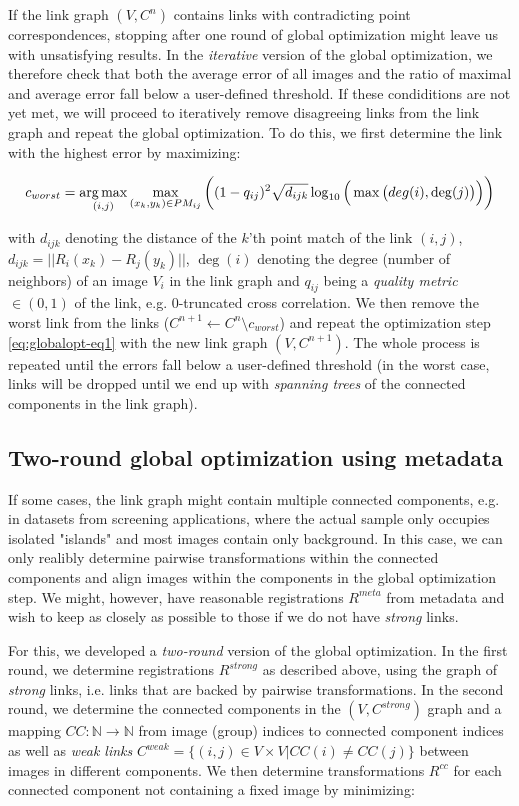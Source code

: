 If the link graph $(V,C^n)$ contains links with contradicting point correspondences, stopping after one round of global optimization might leave us with unsatisfying results. In the \emph{iterative} version of the global optimization, we therefore check that both the average error of all images and the ratio of maximal and average error fall below a user-defined threshold. If these condiditions are not yet met, we will proceed to iteratively remove disagreeing links from the link graph and repeat the global optimization. To do this, we first determine the link with the highest error by maximizing:

\begin{equation}
\label{eq:globalopt-eq3}
c_{worst} = \operatorname*{arg\,max}_{(i,j)} \max_{(x_k, y_k) \in PM_{ij}}\bigg( (1-q_{ij})^2 \sqrt{d_{ijk}} \log_{10}\Big(\max\big(deg(i), \deg(j)\big)\Big)\bigg) 
\end{equation}

with $d_{ijk}$ denoting the distance of the $k$'th point match of the link $(i,j)$, $d_{ijk} = || R_{i}(x_k) - R_{j}(y_k) ||$, $\deg(i)$ denoting the degree (number of neighbors) of an image $V_i$ in the link graph and $q_{ij}$ being a \emph{quality metric} $\in (0,1)$ of the link, e.g. 0-truncated cross correlation. We then remove the worst link from the links ($C^{n+1} \leftarrow C^{n} \setminus c_{worst}$) and repeat the optimization step \ref{eq:globalopt-eq1} with the new link graph $(V, C^{n+1})$. The whole process is repeated until the errors fall below a user-defined threshold (in the worst case, links will be dropped until we end up with \emph{spanning trees} of the connected components in the link graph). 

\subsection*{Two-round global optimization using metadata}

If some cases, the link graph might contain multiple connected components, e.g. in datasets from screening applications, where the actual sample only occupies isolated "islands" and most images contain only background. In this case, we can only realibly determine pairwise transformations within the connected components and align images within the components in the global optimization step. We might, however, have reasonable registrations $R^{meta}$ from metadata and wish to keep as closely as possible to those if we do not have \emph{strong} links.

For this, we developed a \emph{two-round} version of the global optimization. In the first round, we determine registrations $R^{strong}$ as described above, using the graph of \emph{strong} links, i.e. links that are backed by pairwise transformations. In the second round, we determine the connected components in the $(V, C^{strong} )$ graph and a mapping $CC: \mathbb{N} \to \mathbb{N}$ from image (group) indices to  connected component indices as well as \emph{weak links} $C^{weak} = \{(i,j) \in V \times V | CC(i) \neq CC(j) \}$ between images in different components. We then determine transformations $R^{cc}$ for each connected component not containing a fixed image by minimizing:


